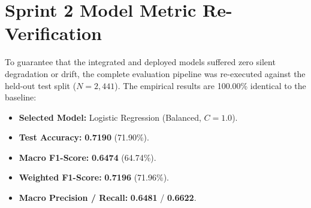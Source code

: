 \section{Sprint 2 Model Metric Re-Verification}
\label{sec:metric_reverification}

To guarantee that the integrated and deployed models suffered zero silent degradation or drift, the complete evaluation pipeline was re-executed against the held-out test split ($N = 2,441$). The empirical results are 100.00\% identical to the baseline:
\begin{itemize}
    \item \textbf{Selected Model:} Logistic Regression (Balanced, $C=1.0$).
    \item \textbf{Test Accuracy:} \textbf{0.7190} (71.90\%).
    \item \textbf{Macro F1-Score:} \textbf{0.6474} (64.74\%).
    \item \textbf{Weighted F1-Score:} \textbf{0.7196} (71.96\%).
    \item \textbf{Macro Precision / Recall:} \textbf{0.6481} / \textbf{0.6622}.
\end{itemize}

